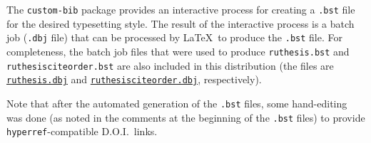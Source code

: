 The \texttt{custom-bib} package provides an interactive process for creating a \texttt{.bst} file for the desired typesetting style.
The result of the interactive process is a batch job (\texttt{.dbj} file) that can be processed by \LaTeX\ to produce the \texttt{.bst} file.
For completeness, the batch job files that were used to produce \texttt{ruthesis.bst} and \texttt{ruthesisciteorder.bst} are also included in this distribution (the files are \href{../bibtexery/ruthesis.dbj}{\texttt{ruthesis.dbj}} and \href{../bibtexery/ruthesisciteorder.dbj}{\texttt{ruthesisciteorder.dbj}}, respectively).

Note that after the automated generation of the \texttt{.bst} files, some hand-editing was done (as noted in the comments at the beginning of the \texttt{.bst} files) to provide \texttt{hyperref}-compatible D.O.I.\ links.
